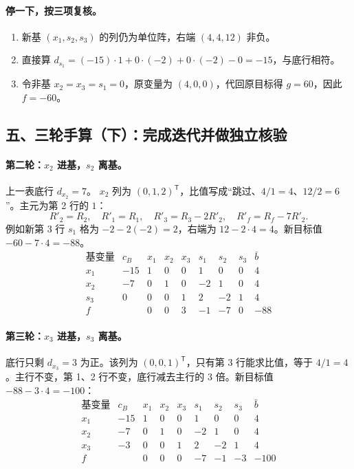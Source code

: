 \documentclass[UTF8,11pt,a4paper]{ctexart}
\begin{document}
\paragraph{停一下，按三项复核。}
\begin{enumerate}
\item 新基 $(x_1,s_2,s_3)$ 的列仍为单位阵，右端 $(4,4,12)$ 非负。
\item 直接算 $d_{s_1}=(-15)\cdot1+0\cdot(-2)+0\cdot(-2)-0=-15$，与底行相符。
\item 令非基 $x_2=x_3=s_1=0$，原变量为 $(4,0,0)$，代回原目标得 $g=60$，因此 $f=-60$。
\end{enumerate}

\clearpage
\subsection*{五、三轮手算（下）：完成迭代并做独立核验}
\paragraph{第二轮：$x_2$ 进基，$s_2$ 离基。}
上一表底行 $d_{x_2}=7$。 $x_2$ 列为 $(0,1,2)^{\mathsf T}$，比值写成“跳过、$4/1=4$、$12/2=6$”。主元为第 2 行的 $1$：
\[
R'_2=R_2,\quad R'_1=R_1,\quad R'_3=R_3-2R'_2,\quad R'_f=R_f-7R'_2.
\]
例如新第 3 行 $s_1$ 格为 $-2-2(-2)=2$，右端为 $12-2\cdot4=4$。新目标值 $-60-7\cdot4=-88$。
\[
\begin{array}{c|r|rrrrrr|r}
\text{基变量}&c_B&x_1&x_2&x_3&s_1&s_2&s_3&\bar b\\\hline
x_1&-15&1&0&0&1&0&0&4\\
x_2&-7&0&1&0&-2&1&0&4\\
s_3&0&0&0&1&2&-2&1&4\\
\hline
f&&0&0&3&-1&-7&0&-88
\end{array}
\]
\paragraph{第三轮：$x_3$ 进基，$s_3$ 离基。}
底行只剩 $d_{x_3}=3$ 为正。该列为 $(0,0,1)^{\mathsf T}$，只有第 3 行能求比值，等于 $4/1=4$。主行不变，第 1、2 行不变，底行减去主行的 3 倍。新目标值 $-88-3\cdot4=-100$：
\[
\begin{array}{c|r|rrrrrr|r}
\text{基变量}&c_B&x_1&x_2&x_3&s_1&s_2&s_3&\bar b\\\hline
x_1&-15&1&0&0&1&0&0&4\\
x_2&-7&0&1&0&-2&1&0&4\\
x_3&-3&0&0&1&2&-2&1&4\\
\hline
f&&0&0&0&-7&-1&-3&-100
\end{array}
\]
\end{document}
